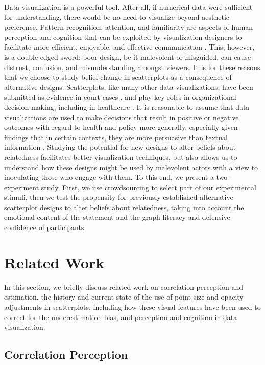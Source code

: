 \documentclass[manuscript,screen,review,anonymous]{acmart}
\begin{document}
Data visualization is a powerful tool. After all, if numerical data were
sufficient for understanding, there would be no need to visualize beyond
aesthetic preference. Pattern recognition, attention, and familiarity
are aspects of human perception and cognition that can be exploited by
visualization designers to facilitate more efficient, enjoyable, and
effective communication \citep{franconeri_2021}. This, however, is a
double-edged sword; poor design, be it malevolent or misguided, can
cause distrust, confusion, and misunderstanding amongst viewers. It is
for these reasons that we choose to study belief change in scatterplots
as a consequence of alternative designs. Scatterplots, like many other
data visualizations, have been submitted as evidence in court cases
\citep{bobko_1979}, and play key roles in organizational
decision-making, including in healthcare \citep{poly_2019}. It is
reasonable to assume that data visualizations are used to make decisions
that result in positive or negative outcomes with regard to health and
policy more generally, especially given findings that in certain
contexts, they are more persuasive than textual information
\citep{pandey_2014}. Studying the potential for new designs to alter
beliefs about relatedness facilitates better visualization techniques,
but also allows us to understand how these designs might be used by
malevolent actors with a view to inoculating those who engage with them.
To this end, we present a two-experiment study. First, we use
crowdsourcing to select part of our experimental stimuli, then we test
the propensity for previously established alternative scatterplot
designs to alter beliefs about relatedness, taking into account the
emotional content of the statement and the graph literacy and defensive
confidence of participants.

\section{Related Work}\label{sec-rel-work-main}

In this section, we briefly discuss related work on correlation
perception and estimation, the history and current state of the use of
point size and opacity adjustments in scatterplots, including how these
visual features have been used to correct for the underestimation bias,
and perception and cognition in data visualization.

\subsection{Correlation Perception}\label{sec-corr-percept}
\end{document}
